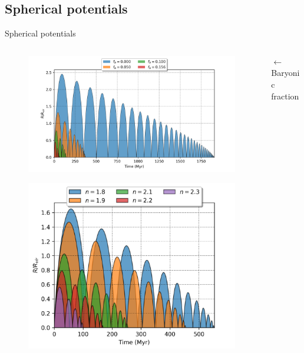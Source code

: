\documentclass{beamer}
\begin{document}
\subsection{Spherical potentials}
\begin{frame}{Spherical potentials}
	\begin{columns}
		\begin{column}{0.4\textwidth}
			\begin{figure}[h]
				\centering
				\includegraphics[width=\linewidth]{"../Files/Week 5/baryonic_fraction_comparison"}
			\end{figure}
			\begin{figure}[h]
				\centering
				\includegraphics[width = \linewidth]{"../Files/Week 6/power_law"}
			\end{figure}
		\end{column}
		\begin{column}{0.7\textwidth}
			$\longleftarrow$ Baryonic fraction
			

\end{column}
\end{columns}
\end{frame}
\end{document}

